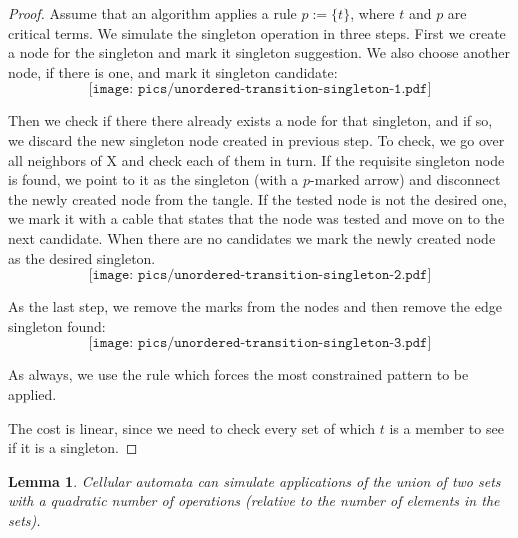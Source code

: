 \documentclass[submission,copyright,creativecommons,english]{eptcs}
\newtheorem{lemma}{Lemma}
\begin{document}
\begin{proof}
Assume that an algorithm applies a rule  $p:=\{t\}$, where $t$ and $p$ are  critical terms. 
We simulate the singleton operation in three steps. First we create a node for the singleton and mark it \textsf{singleton suggestion}. We also choose another node, if there is one, and mark it \textsf{singleton candidate}:
\[\texttt{[image: pics/unordered-transition-singleton-1.pdf]}\]

Then we check if there there already exists a node for that singleton, and if so, we discard the new singleton node created in previous step. To check,  we go over all neighbors of \textsf{X} and check each of them in turn.
If the requisite singleton node is found, we point to it as the singleton (with a $p$-marked arrow) and disconnect the newly created node from the tangle. If the tested node is not the desired one, we mark it with a cable that states that the node was tested and move on to the next candidate. When there are no candidates we mark the newly created node as the desired singleton.
\[\texttt{[image: pics/unordered-transition-singleton-2.pdf]}\]

As the last step, we remove the marks from the nodes and then remove the edge \textsf{singleton found}:
\[\texttt{[image: pics/unordered-transition-singleton-3.pdf]}\]

As always, we use the rule which forces the most constrained pattern to be applied.

{The cost is linear, since we need to check every set of which $t$ is a member to see if it is a singleton.}
\end{proof}

\begin{lemma}\label{th:union_ops}
Cellular automata  can simulate  applications of the union of two sets with a quadratic number of operations (relative to the number of elements in the sets).
\end{lemma}
\end{document}

